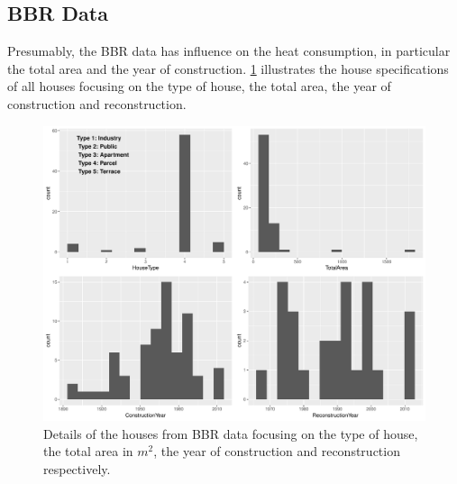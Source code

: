 \subsection{BBR Data}
Presumably, the BBR data has influence on the heat consumption, in particular the total area and the year of construction. \cref{fig: bbr_hist} illustrates the house specifications of all houses focusing on the type of house, the total area, the year of construction and reconstruction. 
\begin{figure}[H]
    \centering
    \includegraphics[width=1.\textwidth]{../../../figures/bbr_hist.pdf}
    \caption{Details of the houses from BBR data focusing on the type of house, the total area in $m^2$, the year of construction and reconstruction respectively.}
    \label{fig: bbr_hist}
\end{figure}

